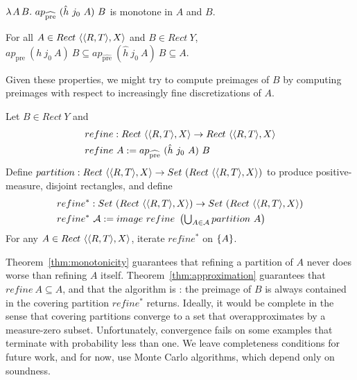 \documentclass{llncs}
\newcommand{\pre}{_\mathrm{pre}}
\newcommand{\prehat}{_\mathrm{\widehat{pre}}}
\begin{document}
\begin{theorem}[monotone]
\label{thm:monotonicity}
$\fun{A\,B}{ap\prehat~(\hat{h}~j_0~A)~B}$ is monotone in $A$ and $B$.%
\end{theorem}

\begin{theorem}
\label{thm:approximation}
For all $A \in Rect~\langle{\langle{R,T}\rangle,X}\rangle$ and $B \in Rect~Y$,
$ap\pre~(h~j_0~A)~B \subseteq ap\prehat~(\hat{h}~j_0~A)~B \subseteq A$.
\end{theorem}

Given these properties, we  might try to compute preimages of $B$ by computing preimages with respect to increasingly fine discretizations of $A$.

\begin{definition}
\label{def:preimage-refinement}
Let $B \in Rect~Y$ and
\begin{equation}
\begin{aligned}
	&refine : Rect~\pair{\pair{R,T},X} \to Rect~\pair{\pair{R,T},X} \\
	&refine~A := ap\prehat~(\hat{h}~j_0~A)~B
\end{aligned}
\end{equation}
Define $partition : Rect~\langle{\langle{R,T}\rangle,X}\rangle \to Set~(Rect~\langle{\langle{R,T}\rangle,X}\rangle)$ to produce positive-measure, disjoint rectangles, and define
\begin{equation}
\begin{aligned}
	&refine^* : Set~(Rect~\langle{\langle{R,T}\rangle,X}\rangle) \to Set~(Rect~\langle{\langle{R,T}\rangle,X}\rangle) \\
	&refine^*~\mathcal{A} := image~refine~\left(\textstyle\bigcup_{A \in \mathcal{A}} partition~A \right)
\end{aligned}
\end{equation}
For any $A \in Rect~\langle{\langle{R,T}\rangle,X}\rangle$, iterate $refine^*$ on $\{{A}\}$.
\end{definition}

Theorem~\ref{thm:monotonicity} guarantees that refining a partition of $A$ never does worse than refining $A$ itself.
Theorem~\ref{thm:approximation} guarantees that $refine~A \subseteq A$, and that the algorithm is : the preimage of $B$ is always contained in the covering partition $refine^*$ returns.
Ideally, it would be complete in the sense that covering partitions converge to a set that overapproximates by a measure-zero subset.
Unfortunately, convergence fails on some examples that terminate with probability less than one.
We leave completeness conditions for future work, and for now, use Monte Carlo algorithms, which depend only on soundness.
\end{document}
